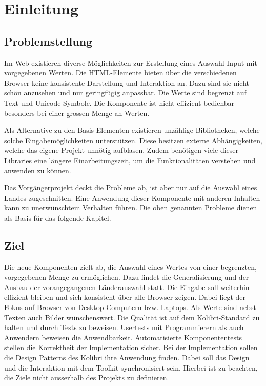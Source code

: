 \chapter{Einleitung}
\label{chap:intro}


\section{Problemstellung}
\label{sec:problem}

Im Web existieren diverse Möglichkeiten zur Erstellung eines Auswahl-Input mit vorgegebenen Werten.
Die HTML-Elemente bieten über die verschiedenen Browser keine konsistente Darstellung und Interaktion an.
Dazu sind sie nicht schön anzusehen und nur geringfügig anpassbar. 
Die Werte sind begrenzt auf Text und Unicode-Symbole.
Die Komponente ist nicht effizient bedienbar - besonders bei einer grossen Menge an Werten.

Als Alternative zu den Basis-Elementen existieren unzählige Bibliotheken, welche solche Eingabemöglichkeiten unterstützen.
Diese besitzen externe Abhängigkeiten, welche das eigene Projekt unnötig aufblasen.
Zudem benötigen viele dieser Libraries eine längere Einarbeitungszeit, um die Funktionalitäten verstehen und anwenden zu können.

Das Vorgängerprojekt deckt die Probleme ab, ist aber nur auf die Auswahl eines Landes zugeschnitten.
Eine Anwendung dieser Komponente mit anderen Inhalten kann zu unerwünschtem Verhalten führen.
Die oben genannten Probleme dienen als Basis für das folgende Kapitel.


\section{Ziel}
\label{sec:goal}

Die neue Komponenten zielt ab, die Auswahl eines Wertes von einer begrenzten, vorgegebenen Menge zu ermöglichen.
Dazu findet die Generalisierung und der Ausbau der vorangegangenen Länderauswahl statt.
Die Eingabe soll weiterhin effizient bleiben und sich konsistent über alle Browser zeigen.
Dabei liegt der Fokus auf Browser von Desktop-Computern bzw. Laptops.
Als Werte sind nebst Texten auch Bilder wünschenswert.
Die Qualität ist auf dem Kolibri-Standard zu halten und durch Tests zu beweisen.
Usertests mit Programmierern als auch Anwendern beweisen die Anwendbarkeit.
Automatisierte Komponententests stellen die Korrektheit der Implementation sicher.
Bei der Implementation sollen die Design Patterns des Kolibri ihre Anwendung finden.
Dabei soll das Design und die Interaktion mit dem Toolkit synchronisiert sein.
Hierbei ist zu beachten, die Ziele nicht ausserhalb des Projekts zu definieren.


